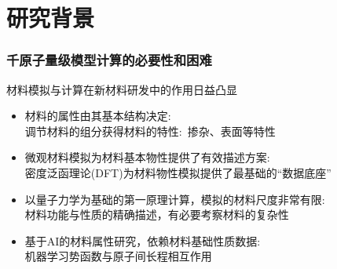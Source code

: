 \small
\section{研究背景}
\begin{frame}
	\frametitle{千原子量级模型计算的必要性和困难}
	材料模拟与计算在新材料研发中的作用日益凸显
	\begin{itemize}
		\item 材料的属性由其基本结构决定:\\
			调节材料的组分获得材料的特性:~掺杂、表面等特性
		\item 微观材料模拟为材料基本物性提供了有效描述方案:\\
			密度泛函理论\textrm{(DFT)}为材料物性模拟提供了最基础的``数据底座''
		\item 以量子力学为基础的第一原理计算，模拟的材料尺度非常有限:\\
			材料功能与性质的精确描述，有必要考察材料的复杂性
		\item 基于\textrm{AI}的材料属性研究，依赖材料基础性质数据:\\
			机器学习势函数与原子间长程相互作用
	\end{itemize}
\end{frame}
